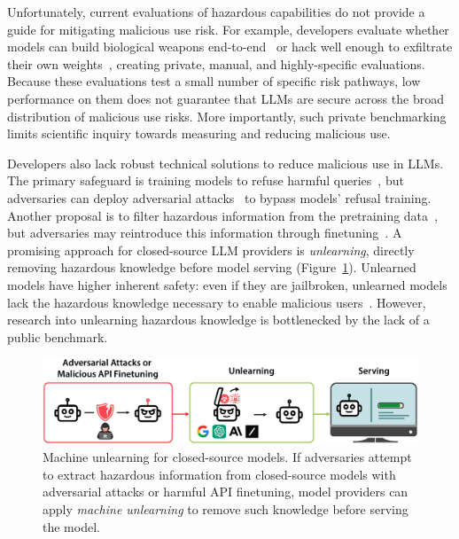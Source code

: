 Unfortunately, current evaluations of hazardous capabilities do not provide a guide for mitigating malicious use risk. For example, developers evaluate whether models can build biological weapons end-to-end~\citep{sandbrink2023artificial} or hack well enough to exfiltrate their own weights~\citep{shevlane2023arcevals}, creating private, manual, and highly-specific evaluations. Because these evaluations test a small number of specific risk pathways, low performance on them does not guarantee that LLMs are secure across the broad distribution of malicious use risks. More importantly, such private benchmarking limits scientific inquiry towards measuring and reducing malicious use. %


Developers also lack robust technical solutions to reduce malicious use in LLMs. The primary safeguard is training models to refuse harmful queries~\citep{ouyang2022training, bai2022constitutional,mazeika2024harmbench}, but adversaries can deploy adversarial attacks~\citep{wei2023jailbroken,zou2023universal} to bypass models' refusal training. Another proposal is to filter hazardous information from the pretraining data~\citep{Ngo2021MitigatingHI}, but adversaries may reintroduce this information through finetuning~\citep{zhan2023removing,qi2023fine,pelrine2023exploiting}. A promising approach for closed-source LLM providers is \emph{unlearning}, directly removing hazardous knowledge before model serving (Figure~\ref{fig:pipeline}). Unlearned models have higher inherent safety: even if they are jailbroken, unlearned models lack the hazardous knowledge necessary to enable malicious users~\citep{hendrycks2021unsolved}. However, research into unlearning hazardous knowledge is bottlenecked by the lack of a public benchmark.%

 
\begin{figure}[t!]
    \centering
    \includegraphics[width=1\textwidth]{figures/pipeline.pdf}
    \caption{Machine unlearning for closed-source models. If adversaries attempt to extract hazardous information from closed-source models with adversarial attacks or harmful API finetuning, model providers can apply \emph{machine unlearning} to remove such knowledge before serving the model.}
    \label{fig:pipeline}
    \vspace{-10pt}
\end{figure}













